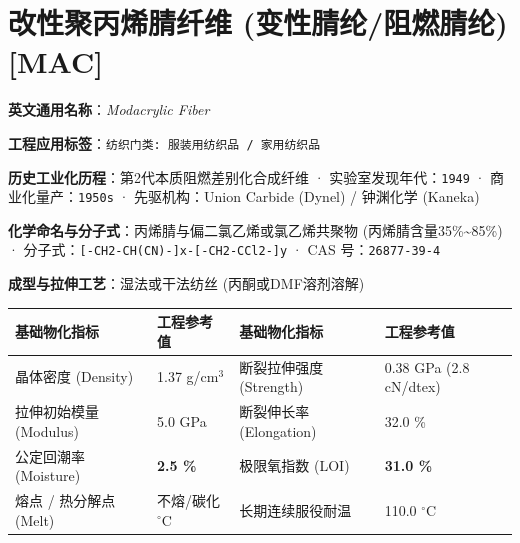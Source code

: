 \documentclass[11pt,openright,twoside,UTF8]{ctexbook}
\begin{document}
\section{改性聚丙烯腈纤维 (变性腈纶/阻燃腈纶) [MAC]}
\label{sec:mac}

\noindent\textbf{英文通用名称}：\textit{Modacrylic Fiber}\par
\noindent\textbf{工程应用标签}：\texttt{纺织门类: 服装用纺织品 / 家用纺织品}\par
\noindent\textbf{历史工业化历程}：第2代本质阻燃差别化合成纤维 · 实验室发现年代：\texttt{1949} · 商业化量产：\texttt{1950s} · 先驱机构：Union Carbide (Dynel) / 钟渊化学 (Kaneka)\par
\noindent\textbf{化学命名与分子式}：丙烯腈与偏二氯乙烯或氯乙烯共聚物 (丙烯腈含量35\%\textasciitilde{}85\%) · 分子式：\texttt{[-CH2-CH(CN)-]x-[-CH2-CCl2-]y} · CAS 号：\texttt{26877-39-4}\par
\noindent\textbf{成型与拉伸工艺}：湿法或干法纺丝 (丙酮或DMF溶剂溶解)\par

\vspace{0.15cm}
\begin{center}
\small
\begin{tabularx}{\textwidth}{p{3.8cm}Xp{3.8cm}X}
\toprule
\textbf{基础物化指标} & \textbf{工程参考值} & \textbf{基础物化指标} & \textbf{工程参考值} \\
\midrule
晶体密度 (Density) & 1.37 g/cm$^3$ & 断裂拉伸强度 (Strength) & 0.38 GPa (2.8 cN/dtex) \\
拉伸初始模量 (Modulus) & 5.0 GPa & 断裂伸长率 (Elongation) & 32.0 \% \\
公定回潮率 (Moisture) & \textbf{2.5 \%} & 极限氧指数 (LOI) & \textbf{31.0 \%} \\
熔点 / 热分解点 (Melt) & 不熔/碳化 $^\circ\mathrm{C}$ & 长期连续服役耐温 & 110.0 $^\circ\mathrm{C}$ \\
\bottomrule
\end{tabularx}
\end{center}
\vspace{0.15cm}
\end{document}
